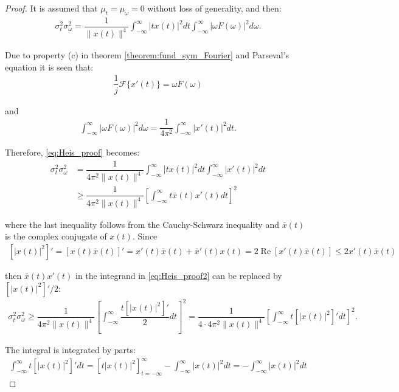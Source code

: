 \begin{proof}
It is assumed that $\mu_t = \mu_\omega = 0$ without loss of generality, and then:
\begin{align} \label{eq:Heis_proof}
\sigma_t^2 \sigma_\omega^2 = \dfrac{1}{\|x(t)\|^4} \int_{-\infty}^\infty |tx(t)|^2 dt \int_{-\infty}^\infty |\omega F(\omega)|^2 d\omega.
\end{align}

Due to property (c) in theorem \ref{theorem:fund_sym_Fourier} and Parseval's equation it is seen that:
\begin{align*}
\dfrac{1}{j} \mathcal{F}\{x'(t)\} = \omega F(\omega)
\end{align*}

and
\begin{align*}
\int_{-\infty}^\infty |\omega F(\omega)|^2 d\omega = \dfrac{1}{4\pi^2} \int_{-\infty}^\infty |x'(t)|^2 dt.
\end{align*}

Therefore, \eqref{eq:Heis_proof} becomes:
\begin{align} \label{eq:Heis_proof2}
\sigma_t^2 \sigma_\omega^2 &= \dfrac{1}{4\pi^2 \|x(t)\|^4} \int_{-\infty}^\infty |tx(t)|^2 dt \int_{-\infty}^\infty | x'(t)|^2 dt \nonumber \\
&\geq \dfrac{1}{4\pi^2 \|x(t)\|^4} \left[ \int_{-\infty}^\infty t \bar{x}(t)x'(t) dt \right]^2
\end{align}

where the last inequality follows from the Cauchy-Schwarz inequality and $\bar{x}(t)$ is the complex conjugate of $x(t)$. Since
\begin{align*}
\left[ |x(t)|^2 \right]' = \left[ x(t) \bar{x}(t) \right]' = x'(t) \bar{x}(t) + \bar{x}'(t) x(t) = 2 \operatorname{Re} \left[ x'(t) \bar{x}(t) \right] \leq 2 x'(t) \bar{x}(t)
\end{align*}

then $\bar{x}(t) x'(t)$ in the integrand in \eqref{eq:Heis_proof2} can be replaced by $\left[ |x(t)|^2 \right]'/2$:
\begin{align} \label{eq:Heis_proof3}
\sigma_t^2 \sigma_\omega^2 \geq \dfrac{1}{4\pi^2 \|x(t)\|^4} \left[ \int_{-\infty}^\infty \dfrac{t \left[ |x(t)|^2 \right]'}{2} dt \right]^2 = \dfrac{1}{4 \cdot 4\pi^2 \|x(t)\|^4} \left[ \int_{-\infty}^\infty t \left[ |x(t)|^2 \right]' dt \right]^2.
\end{align}

The integral is integrated by parts:
\begin{align*}
\int_{-\infty}^\infty t \left[ |x(t)|^2 \right]' dt = \left[ t |x(t)|^2 \right]_{t=-\infty}^\infty - \int_{-\infty}^\infty |x(t)|^2 dt = - \int_{-\infty}^\infty |x(t)|^2 dt
\end{align*}


\end{proof}
